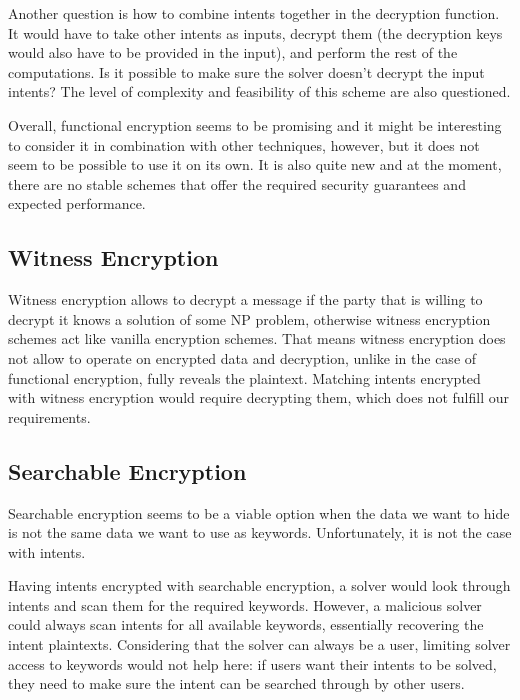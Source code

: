\documentclass[
    9pt,            %
    report,        %
    affiltop,       %
]{art}
\begin{document}
\hfill

Another question is how to combine intents together in the decryption function. It would have to take other intents as inputs, decrypt them (the decryption keys would also have to be provided in the input), and perform the rest of the computations. Is it possible to make sure the solver doesn't decrypt the input intents? The level of complexity and feasibility of this scheme are also questioned.

\hfill

Overall, functional encryption seems to be promising and it might be interesting to consider it in combination with other techniques, however, but it does not seem to be possible to use it on its own. It is also quite new and at the moment, there are no stable schemes that offer the required security guarantees and expected performance.


\subsection{Witness Encryption}

Witness encryption allows to decrypt a message if the party that is willing to decrypt it knows a solution of some NP problem, otherwise witness encryption schemes act like vanilla encryption schemes. That means witness encryption does not allow to operate on encrypted data and decryption, unlike in the case of functional encryption, fully reveals the plaintext. Matching intents encrypted with witness encryption would require decrypting them, which does not fulfill our requirements.

\subsection{Searchable Encryption}

Searchable encryption seems to be a viable option when the data we want to hide is not the same data we want to use as keywords. Unfortunately, it is not the case with intents.

Having intents encrypted with searchable encryption, a solver would look through intents and scan them for the required keywords. However, a malicious solver could always scan intents for all available keywords, essentially recovering the intent plaintexts. Considering that the solver can always be a user, limiting solver access to keywords would not help here: if users want their intents to be solved, they need to make sure the intent can be searched through by other users. 
\end{document}
